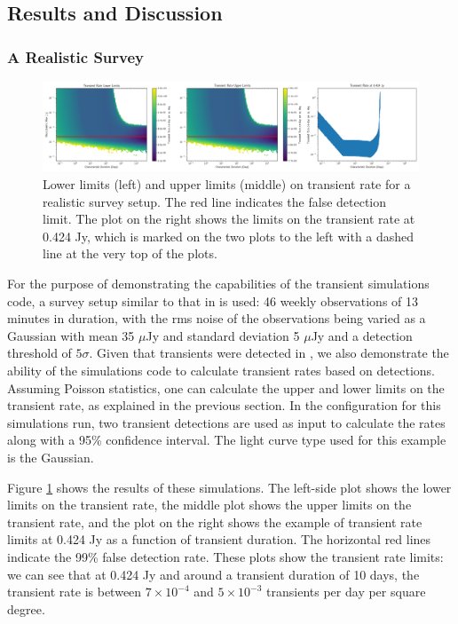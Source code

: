 \documentclass[12pt]{article}
\begin{document}
\subsection{Results and Discussion}\label{sec:results1}

\subsubsection{A Realistic Survey}

\begin{figure}
\includegraphics[width=\columnwidth]{figure2.png}
\caption{Lower limits (left) and upper limits (middle) on transient rate for a realistic survey setup. The red line indicates the false detection limit. The plot on the right shows the limits on the transient rate at 0.424 Jy, which is marked on the two plots to the left with a dashed line at the very top of the plots.}
\label{realscen}
 \end{figure}

For the purpose of demonstrating the capabilities of the transient simulations code, a survey setup similar to that in \citet{10.1093/mnras/stz3027} is used: 46 weekly observations of 13 minutes in duration, with the rms noise of the observations being varied as a Gaussian with mean 35 $\mu$Jy and standard deviation 5 $\mu$Jy and a detection threshold of $5\sigma$. Given that transients were detected in \citet{10.1093/mnras/stz3027} , we also demonstrate the ability of the simulations code to calculate transient rates based on detections. Assuming Poisson statistics, one can calculate the upper and lower limits on the transient rate, as explained in the previous section. In the configuration for this simulations run, two transient detections are used as input to calculate the rates along with a 95\% confidence interval. The light curve type used for this example is the Gaussian.

Figure \ref{realscen} shows the results of these simulations. The left-side plot shows the lower limits on the transient rate, the middle plot shows the upper limits on the transient rate, and the plot on the right shows the example of transient rate limits at 0.424 Jy as a function of transient duration. The horizontal red lines indicate the 99\% false detection rate. These plots show the transient rate limits: we can see that at 0.424 Jy and around a transient duration of 10 days, the transient rate is between $7\times10^{-4}$ and $5\times10^{-3}$ transients per day per square degree. 
\end{document}
